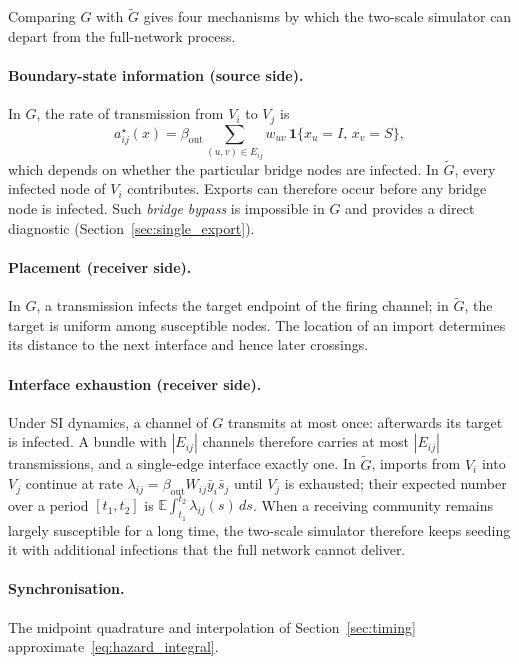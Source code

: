 \documentclass[a4paper,fleqn]{cas-sc}
\newcommand{\ibar}{\bar{y}}
\newcommand{\sbar}{\bar{s}}
\newcommand{\ind}{\mathbf{1}}
\begin{document}
Comparing $G$ with $\tilde G$ gives four mechanisms by which the two-scale simulator can depart from the full-network process.

\paragraph{Boundary-state information (source side).}
In $G$, the rate of transmission from $V_i$ to $V_j$ is
\begin{equation}
\label{eq:exact_rate}
a^\star_{ij}(x)=\beta_{\mathrm{out}}\sum_{(u,v)\in E_{ij}}w_{uv}\,\ind\{x_u=I,\,x_v=S\},
\end{equation}
which depends on whether the particular bridge nodes are infected. In $\tilde G$, every infected node of $V_i$ contributes. Exports can therefore occur before any bridge node is infected. Such \emph{bridge bypass} is impossible in $G$ and provides a direct diagnostic (Section~\ref{sec:single_export}).

\paragraph{Placement (receiver side).}
In $G$, a transmission infects the target endpoint of the firing channel; in $\tilde G$, the target is uniform among susceptible nodes. The location of an import determines its distance to the next interface and hence later crossings.

\paragraph{Interface exhaustion (receiver side).}
Under SI dynamics, a channel of $G$ transmits at most once: afterwards its target is infected. A bundle with $|E_{ij}|$ channels therefore carries at most $|E_{ij}|$ transmissions, and a single-edge interface exactly one. In $\tilde G$, imports from $V_i$ into $V_j$ continue at rate $\lambda_{ij}=\beta_{\mathrm{out}}W_{ij}\ibar_i\sbar_j$ until $V_j$ is exhausted; their expected number over a period $[t_1,t_2]$ is $\mathbb{E}\int_{t_1}^{t_2}\lambda_{ij}(s)\,ds$. When a receiving community remains largely susceptible for a long time, the two-scale simulator therefore keeps seeding it with additional infections that the full network cannot deliver.

\paragraph{Synchronisation.}
The midpoint quadrature and interpolation of Section~\ref{sec:timing} approximate~\eqref{eq:hazard_integral}.
\end{document}
